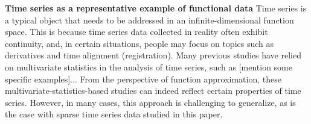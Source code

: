 \documentclass{article}
\begin{document}
\textbf{Time series as a representative example of functional data}
Time series is a typical object that needs to be addressed in an infinite-dimensional function space. 
This is because time series data collected in reality often exhibit continuity, and, in certain situations, people may focus on topics such as derivatives and time alignment (registration).
Many previous studies have relied on multivariate statistics in the analysis of time series, such as [mention some specific examples]...
From the perspective of function approximation, these multivariate-statistics-based studies can indeed reflect certain properties of time series. 
However, in many cases, this approach is challenging to generalize, as is the case with sparse time series data studied in this paper.
\end{document}

